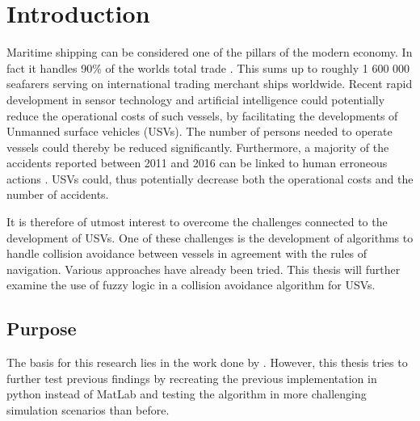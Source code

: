 

\chapter{Introduction} %

\label{Introduction} %


\newcommand{\keyword}[1]{\textbf{#1}}
\newcommand{\tabhead}[1]{\textbf{#1}}
\newcommand{\code}[1]{\texttt{#1}}
\newcommand{\file}[1]{\texttt{\bfseries#1}}
\newcommand{\option}[1]{\texttt{\itshape#1}}


Maritime shipping can be considered one of the pillars of the modern economy. In fact it handles 90\% of the worlds total trade  \cite{percent_trade}. This sums up to roughly 1 600 000 seafarers serving on international trading merchant ships worldwide. Recent rapid development in sensor technology and artificial intelligence could potentially reduce the operational costs of such vessels, by facilitating the developments of  Unmanned surface vehicles (USVs). The number of persons needed to operate vessels could thereby be reduced significantly. Furthermore, a majority of the accidents reported between 2011 and 2016 can be linked to human erroneous actions \cite{marine_casualities_incidents_2017}. USVs could, thus potentially decrease both the operational costs and the number of accidents.

It is therefore of utmost interest to overcome the challenges connected to the development of USVs. One of these challenges  is the development of algorithms to handle collision avoidance between vessels in agreement with the rules of navigation. Various approaches have already been tried. This thesis will further examine the use of  fuzzy logic in a collision avoidance algorithm for USVs.
\section{Purpose}
The basis for this research lies in the work done by \textcite{perera2012intelligent}. However, this thesis tries to further test previous findings by recreating the previous implementation in python instead of MatLab and testing the algorithm in more challenging simulation scenarios than before.

